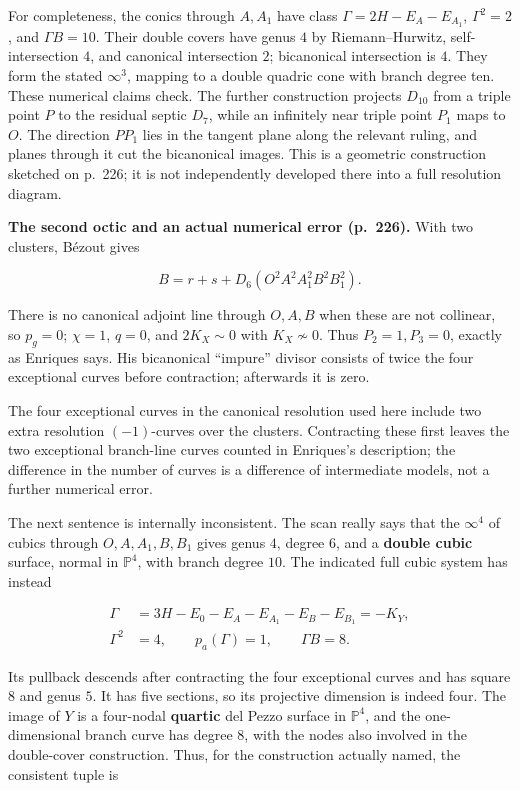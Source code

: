 For completeness, the conics through \(A,A_1\) have class \(\Gamma=2H-E_A-E_{A_1}\), \(\Gamma^2=2\), and \(\Gamma B=10\). Their double covers have genus \(4\) by Riemann--Hurwitz, self-intersection \(4\), and canonical intersection \(2\); bicanonical intersection is \(4\). They form the stated \(\infty^3\), mapping to a double quadric cone with branch degree ten. These numerical claims check. The further construction projects \(D_{10}\) from a triple point \(P\) to the residual septic \(D_7\), while an infinitely near triple point \(P_1\) maps to \(O\). The direction \(PP_1\) lies in the tangent plane along the relevant ruling, and planes through it cut the bicanonical images. This is a geometric construction sketched on p.~226; it is not independently developed there into a full resolution diagram.

\textbf{The second octic and an actual numerical error (p.~226).} With two clusters, Bézout gives

\[
B=r+s+D_6(O^2A^2A_1^2B^2B_1^2).
\]

There is no canonical adjoint line through \(O,A,B\) when these are not collinear, so \(p_g=0\); \(\chi=1\), \(q=0\), and \(2K_X\sim0\) with \(K_X\not\sim0\). Thus \(P_2=1,P_3=0\), exactly as Enriques says. His bicanonical ``impure'' divisor consists of twice the four exceptional curves before contraction; afterwards it is zero.

The four exceptional curves in the canonical resolution used here include two extra resolution \((-1)\)-curves over the clusters. Contracting these first leaves the two exceptional branch-line curves counted in Enriques's description; the difference in the number of curves is a difference of intermediate models, not a further numerical error.

The next sentence is internally inconsistent. The scan really says that the \(\infty^4\) of cubics through \(O,A,A_1,B,B_1\) gives genus \(4\), degree \(6\), and a \textbf{double cubic} surface, normal in \(\mathbb P^4\), with branch degree \(10\). The indicated full cubic system has instead

\[
\begin{aligned}
\Gamma&=3H-E_0-E_A-E_{A_1}-E_B-E_{B_1}=-K_Y,\\
\Gamma^2&=4,\qquad p_a(\Gamma)=1,\qquad \Gamma B=8.
\end{aligned}
\]

Its pullback descends after contracting the four exceptional curves and has square \(8\) and genus \(5\). It has five sections, so its projective dimension is indeed four. The image of \(Y\) is a four-nodal \textbf{quartic} del Pezzo surface in \(\mathbb P^4\), and the one-dimensional branch curve has degree \(8\), with the nodes also involved in the double-cover construction. Thus, for the construction actually named, the consistent tuple is

